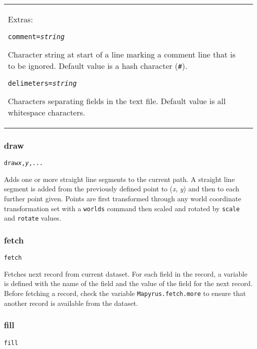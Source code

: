 \begin{longtable}{|p{3cm}|p{10cm}|}
\vspace{10pt}
Extras:

\texttt{comment=\textit{string}}

Character string at start of a line marking a comment line that
is to be ignored.  Default value is a hash character (\texttt{\#}).

\vspace{10pt}
\texttt{delimeters=\textit{string}}

Characters separating fields in the text file.  Default value
is all whitespace characters. \\

\end{longtable}

\subsubsection{draw}

\begin{alltt}
draw \textit{x}, \textit{y}, ...
\end{alltt}

Adds one or more straight line segments to the current path.
A straight line segment is added from the previously defined point
to (\textit{x}, \textit{y}) and then to each further point given.
Points are first transformed through any world coordinate
transformation set with a \texttt{worlds} command
then scaled and rotated by \texttt{scale}
and \texttt{rotate} values.

\subsubsection{fetch}

\begin{alltt}
fetch
\end{alltt}

Fetches next record from current dataset.
For each field in the record, a variable is defined with the name
of the field and the value of the field for the next record.
Before fetching a record, check the variable
\texttt{Mapyrus.fetch.more}
to ensure that another record is available from the dataset.

\subsubsection{fill}

\begin{alltt}
fill
\end{alltt}

